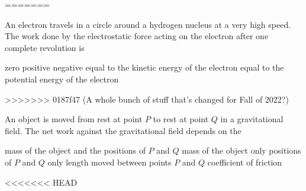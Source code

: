 \documentclass{../../oss-apphys-exam}
\begin{document}
\begin{multicols*}{2}
\begin{questions}
\begin{questions}
=======

    \question An electron travels in a circle around a hydrogen nucleus at a
    very high speed. The work done by the electrostatic force acting on the
    electron after one complete revolution is
    \begin{choices}
      \choice zero
      \choice positive
      \choice negative
      \choice equal to the kinetic energy of the electron
      \choice equal to the potential energy of the electron
    \end{choices}
    \vspace{.7in}
>>>>>>> 0187f47 (A whole bunch of stuff that's changed for Fall of 2022?)
    
    \question An object is moved from rest at point $P$ to rest at point $Q$ in
    a gravitational field. The net work against the gravitational field depends
    on the
    \begin{choices}
      \choice mass of the object and the positions of $P$ and $Q$
      \choice mass of the object only
      \choice positions of $P$ and $Q$ only
      \choice length moved between points $P$ and $Q$
      \choice coefficient of friction
    \end{choices}
<<<<<<< HEAD



\end{questions}
\end{questions}
\end{multicols*}
\end{document}
